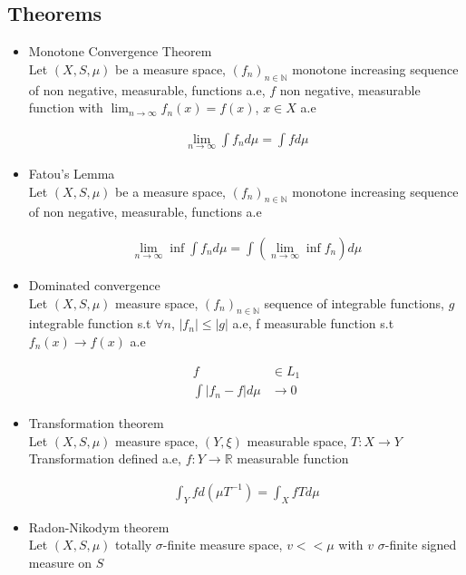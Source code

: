 \subsection{Theorems}
\begin{itemize}
\item Monotone Convergence Theorem \\

Let $(X,S,\mu)$ be a measure space, $(f_n)_{n \in \mathbb{N}}$ monotone increasing sequence of non negative, measurable, functions a.e, $f$ non negative, measurable function with $ \lim_{n \to \infty}f_n(x) = f(x)$, $x\in X$ a.e

\begin{align}
\lim_{n \to \infty}\int f_nd\mu = \int fd\mu
\end{align}

\item Fatou's Lemma \\
Let $(X,S,\mu)$ be a measure space, $(f_n)_{n \in \mathbb{N}}$ monotone increasing sequence of non negative, measurable, functions a.e

\begin{align}
\lim_{n \to \infty}\inf\int f_nd\mu = \int(\lim_{n \to \infty}\inf f_n)d\mu
\end{align}

\item Dominated convergence \\
Let $(X,S,\mu)$ measure space, $(f_n)_{n \in \mathbb{N}}$ sequence of integrable functions, $g$ integrable function s.t $\forall n$, $\left|f_n\right| \leq \left|g\right|$ a.e, f measurable function s.t $f_n(x) \rightarrow f(x)$ a.e

\begin{align}
f &\in L_1 \\ 
\int \left|f_n - f\right|d\mu &\rightarrow 0
\end{align}


\item Transformation theorem  \\
Let $(X,S,\mu)$ measure space, $(Y,\xi)$ measurable space, $T : X \rightarrow Y$ Transformation defined a.e, $f : Y \rightarrow \mathbb{R}$ measurable function

\begin{align}
\int_Y fd(\mu T^{-1}) = \int_X fTd\mu
\end{align}

\item Radon-Nikodym theorem  \\
Let $(X,S,\mu)$ totally $\sigma$-finite measure space, $ v << \mu $ with $v$ $\sigma$-finite signed measure on $S$


\end{itemize}
